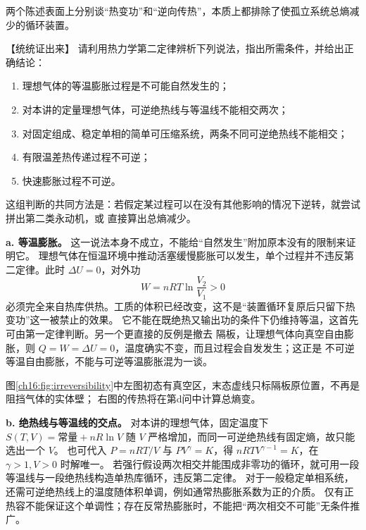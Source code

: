 {\begin{xesolution}
两个陈述表面上分别谈“热变功”和“逆向传热”，本质上都排除了使孤立系统总熵减少的循环装置。
\end{xesolution}


\begin{origexamplebox}{【统统证出来】}\label{ch16:ex:s30-21-3}
请利用热力学第二定律辨析下列说法，指出所需条件，并给出正确结论：
\begin{enumerate}[label=\alph*.]
  \item 理想气体的等温膨胀过程是不可能自然发生的；
  \item 对本讲的定量理想气体，可逆绝热线与等温线不能相交两次；
  \item 对固定组成、稳定单相的简单可压缩系统，两条不同可逆绝热线不能相交；
  \item 有限温差热传递过程不可逆；
  \item 快速膨胀过程不可逆。
\end{enumerate}

\ThQIrreversibility
\end{origexamplebox}\par\nopagebreak[4]

\par\nopagebreak[4]\begin{xesolution}
这组判断的共同方法是：若假定某过程可以在没有其他影响的情况下逆转，就尝试拼出第二类永动机，或
直接算出总熵减少。

\textbf{a. 等温膨胀。} 这一说法本身不成立，不能给“自然发生”附加原本没有的限制来证明它。
理想气体在恒温环境中推动活塞缓慢膨胀可以发生，单个过程并不违反第二定律。此时 $\Delta U=0$，对外功
\[
  W=nRT\ln\frac{V_2}{V_1}>0
\]
必须完全来自热库供热。工质的体积已经改变，这不是“装置循环复原后只留下热变功”这一被禁止的效果。
它不能在既绝热又输出功的条件下仍维持等温，这首先可由第一定律判断。另一个更直接的反例是撤去
隔板，让理想气体向真空自由膨胀，则 $Q=W=\Delta U=0$，温度确实不变，而且过程会自发发生；这正是
不可逆等温自由膨胀，不能与可逆等温膨胀混为一谈。

\par\noindent\begin{minipage}{\linewidth}
\irreversibleProcessesDiagram
{}\label{ch16:fig:irreversibility}
\end{minipage}\par\medskip
图\ref{ch16:fig:irreversibility}中左图初态有真空区，末态虚线只标隔板原位置，不再是阻挡气体的实体壁；
右图的传热将在第d问中计算总熵变。

\textbf{b. 绝热线与等温线的交点。} 对本讲的理想气体，固定温度下
$S(T,V)=\text{常量}+nR\ln V$ 随 $V$ 严格增加，而同一可逆绝热线有固定熵，故只能选出一个 $V$。
也可代入 $P=nRT/V$ 与 $PV^\gamma=K$，得 $nRTV^{\gamma-1}=K$，在 $\gamma>1,V>0$ 时解唯一。
若强行假设两次相交并能围成非零功的循环，就可用一段等温线与一段绝热线构造单热库循环，违反第二定律。
对于一般稳定单相系统，还需可逆绝热线上的温度随体积单调，例如通常热膨胀系数为正的介质。
仅有正热容不能保证这个单调性；存在反常热膨胀时，不能把“两次相交不可能”无条件推广。


\end{xesolution}}
